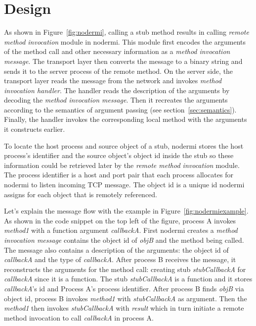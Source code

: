 \section{Design}

\nodermifig{}

As shown in Figure~\ref{fig:nodermi},
calling a stub method results in calling
\emph{remote method invocation} module in nodermi.
This module
first encodes the arguments of the method call
 and other necessary information
as a \emph{method invocation message}.
The transport layer then converts the message to
a binary string and sends it
to the server process of the remote method.
On the server side, the transport layer reads
the message from the network and invokes \emph{method invocation handler}.
The handler reads the description of the arguments 
 by decoding the \emph{method invocation message}.
Then it recreates the arguments according to 
the semantics of argument passing (see section~\ref{sec:semantics}).
Finally, the handler invokes the corresponding local method with the arguments
it constructs earlier.

To locate the host process and source object of a stub,
nodermi stores the host process's identifier and the source object's object id
inside the stub so these information could be retrieved later by 
the \emph{remote method invocation} module.
The process identifier is a host and port pair that each process
allocates for nodermi to listen incoming TCP message.
The object id is a unique id nodermi assigns for each object that
is remotely referenced.


Let's explain the message flow with the example
in Figure~\ref{fig:nodermiexample}.
As shown in the code snippet on the top left of the figure,
process A invokes \emph{method1} with a function argument \emph{callbackA}.
First nodermi creates a \emph{method invocation message}
contains the object id of \emph{objB} and the method being called.
The message also contains a description of the arguments:
the object id of \emph{callbackA} and
the type of \emph{callbackA}.
After process B receives the message,
it reconstructs the arguments for the method call:
creating stub \emph{stubCallbackA} for \emph{callbackA} since it is a function.
The stub \emph{stubCallbackA} is a function and
it stores \emph{callbackA}'s id and Process A's process identifier.
After process B finds \emph{objB} via object id,
process B invokes \emph{method1} with \emph{stubCallbackA} as argument.
Then the \emph{method1} then invokes \emph{stubCallbackA} with \emph{result}
which in turn initiate a remote method invocation to call \emph{callbackA} in process A.


